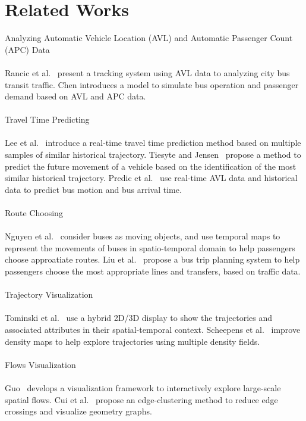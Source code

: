 \documentclass[journal]{vgtc}                %
\begin{document}
\section{Related Works}
Analyzing Automatic Vehicle Location (AVL) and Automatic Passenger Count (APC) Data
\\\\
Rancic et al.~\cite{Rancic2008} present a tracking system using AVL data to analyzing city bus transit traffic.
Chen \cite{5203406} introduces a model to simulate bus operation and passenger demand based on AVL and APC data.
\\\\
Travel Time Predicting
\\\\
Lee et al.~\cite{Lee:2012:HNF:2424321.2424357} introduce a real-time travel time prediction method based on multiple samples of similar historical trajectory.
Tiesyte and Jensen~\cite{Tiesyte2008} propose a method to predict the future movement of a vehicle based on the identification of the most similar historical trajectory.
Predic et al.~\cite{Predic2007} use real-time AVL data and historical data to predict bus motion and bus arrival time.
\\\\
Route Choosing
\\\\
Nguyen et al.~\cite{Nguyen2012} consider buses as moving objects, and use temporal maps to represent the movements of buses in spatio-temporal domain to help passengers choose approatiate routes.
Liu et al.~\cite{5958130} propose a bus trip planning system to help passengers choose the most appropriate lines and transfers, based on traffic data.
\\\\
Trajectory Visualization
\\\\
Tominski et al.~\cite{Tominski2012} use a hybrid 2D/3D display to show the trajectories and associated attributes in their spatial-temporal context.
Scheepens et al.~\cite{6065019} improve density maps to help explore trajectories using multiple density fields.
\\\\
Flows Visualization
\\\\
Guo~\cite{5290710} develops a visualization framework to interactively explore large-scale spatial flows.
Cui et al.~\cite{4658140} propose an edge-clustering method to reduce edge crossings and visualize geometry graphs.
\end{document}
